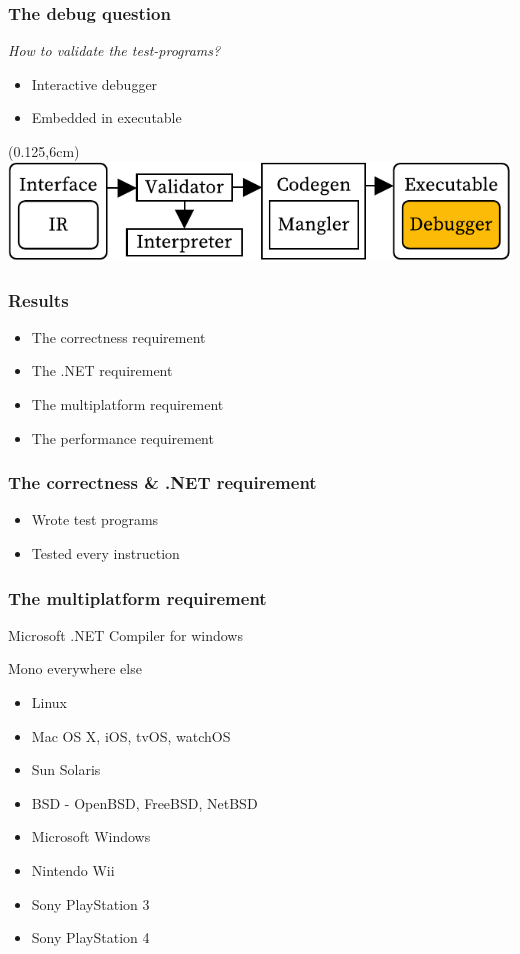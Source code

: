 \documentclass[xetex,serif,aspectratio=169]{beamer}
\begin{document}
\begin{frame}[t]
\end{frame}\begin{frame}[t]\frametitle{The debug question}
\textit{How to validate the test-programs?}
\begin{itemize}
    \item Interactive debugger
    \item Embedded in executable
\end{itemize}
\begin{textblock*}{0.75\paperwidth}(0.125\paperwidth,6cm)\includegraphics[width=0.75\paperwidth]{overview_debugger}\end{textblock*}

\end{frame}\begin{frame}\frametitle{Results}
\begin{itemize}
    \item The correctness requirement
    \item The .NET requirement
    \item The multiplatform requirement
    \item The performance requirement
\end{itemize}

\end{frame}\begin{frame}\frametitle{The correctness \& .NET requirement}
\begin{itemize}
    \item Wrote test programs
    \item Tested every instruction
\end{itemize}


\end{frame}\begin{frame}\frametitle{The multiplatform requirement}
    Microsoft .NET Compiler for windows

    Mono everywhere else

\begin{itemize}
    \item Linux
    \item Mac OS X, iOS, tvOS, watchOS
    \item Sun Solaris
    \item BSD - OpenBSD, FreeBSD, NetBSD
    \item Microsoft Windows
    \item Nintendo Wii
    \item Sony PlayStation 3
    \item Sony PlayStation 4
\end{itemize}


\end{frame}
\end{document}
